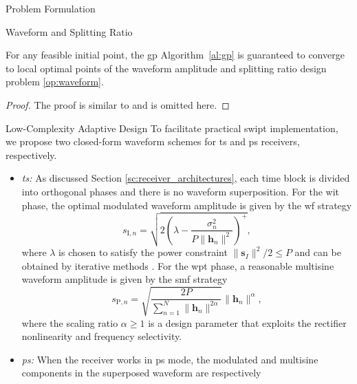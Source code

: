 \begin{section}{Problem Formulation}
\begin{subsection}{Waveform and Splitting Ratio}
		\begin{proposition}\label{pr:gp}
			For any feasible initial point, the \gls{gp} Algorithm~\ref{al:gp} is guaranteed to converge to local optimal points of the waveform amplitude and splitting ratio design problem \eqref{op:waveform}.
		\end{proposition}

		\begin{proof}\label{pf:gp}
			The proof is similar to \cite{Clerckx2016a,Clerckx2018b} and is omitted here.
		\end{proof}
	\end{subsection}


	\begin{subsection}{Low-Complexity Adaptive Design}
		To facilitate practical \gls{swipt} implementation, we propose two closed-form waveform schemes for \gls{ts} and \gls{ps} receivers, respectively.
		\begin{itemize}
			\item \emph{\gls{ts}:} As discussed Section \ref{sc:receiver_architectures}, each time block is divided into orthogonal phases and there is no waveform superposition.
			For the \gls{wit} phase, the optimal modulated waveform amplitude is given by the \gls{wf} strategy \cite{Tse2005}
			\begin{equation}\label{eq:wf}
				s_{\mathrm{I}, n} = \sqrt{2\left(\lambda - \frac{\sigma_n^2}{P \lVert{\mathbf{h}_n}\rVert^2}\right)^+},
			\end{equation}
			where $\lambda$ is chosen to satisfy the power constraint $\lVert{\mathbf{s}_I}\rVert^2 / 2 \le P$ and can be obtained by iterative methods \cite{Clerckx2013}.
			For the \gls{wpt} phase, a reasonable multisine waveform amplitude is given by the \gls{smf} strategy \cite{Clerckx2017}
			\begin{equation}\label{eq:smf}
				s_{\mathrm{P}, n} = \sqrt{\frac{2 P}{\sum_{n=1}^N \lVert{\mathbf{h}_n \rVert^{2 \alpha}}}}\lVert{\mathbf{h}_n}\rVert^\alpha,
			\end{equation}
			where the scaling ratio $\alpha \ge 1$ is a design parameter that exploits the rectifier nonlinearity and frequency selectivity.
			\item \emph{\gls{ps}:} When the receiver works in \gls{ps} mode, the modulated and multisine components in the superposed waveform are respectively
			\begin{align}

\end{align}
\end{itemize}
\end{subsection}
\end{section}
